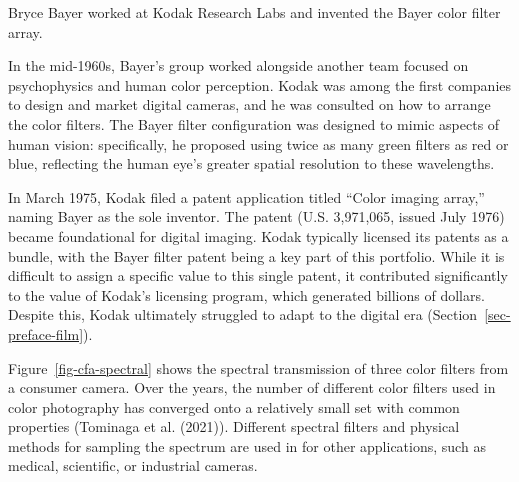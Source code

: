 \documentclass[
  letterpaper,
]{book}
\begin{document}
\begin{tcolorbox}[enhanced jigsaw, titlerule=0mm, colback=white, left=2mm, colframe=quarto-callout-note-color-frame, breakable, rightrule=.15mm, bottomtitle=1mm, title=\textcolor{quarto-callout-note-color}{\faInfo}\hspace{0.5em}{Bayer pattern}, opacitybacktitle=0.6, toprule=.15mm, colbacktitle=quarto-callout-note-color!10!white, toptitle=1mm, coltitle=black, arc=.35mm, leftrule=.75mm, opacityback=0, bottomrule=.15mm]

Bryce Bayer worked at Kodak Research Labs and invented the Bayer color
filter array.

In the mid-1960s, Bayer's group worked alongside another team focused on
psychophysics and human color perception. Kodak was among the first
companies to design and market digital cameras, and he was consulted on
how to arrange the color filters. The Bayer filter configuration was
designed to mimic aspects of human vision: specifically, he proposed
using twice as many green filters as red or blue, reflecting the human
eye's greater spatial resolution to these wavelengths.

In March 1975, Kodak filed a patent application titled ``Color imaging
array,'' naming Bayer as the sole inventor. The patent (U.S. 3,971,065,
issued July 1976) became foundational for digital imaging. Kodak
typically licensed its patents as a bundle, with the Bayer filter patent
being a key part of this portfolio. While it is difficult to assign a
specific value to this single patent, it contributed significantly to
the value of Kodak's licensing program, which generated billions of
dollars. Despite this, Kodak ultimately struggled to adapt to the
digital era (Section~\ref{sec-preface-film}).

\end{tcolorbox}

Figure~\ref{fig-cfa-spectral} shows the spectral transmission of three
color filters from a consumer camera. Over the years, the number of
different color filters used in color photography has converged onto a
relatively small set with common properties (Tominaga et al. (2021)).
Different spectral filters and physical methods for sampling the
spectrum are used in for other applications, such as medical,
scientific, or industrial cameras.
\end{document}
